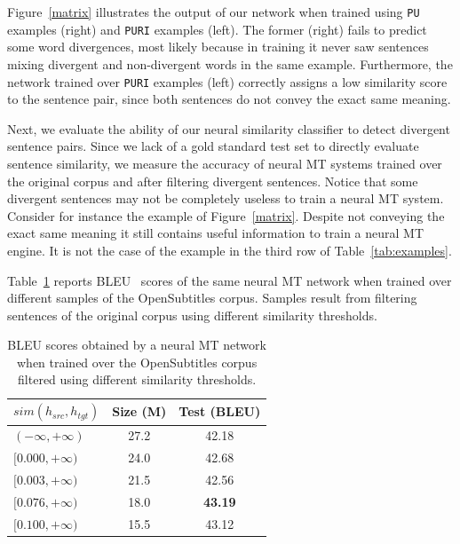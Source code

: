\documentclass[11pt,a4paper]{article}
\begin{document}
Figure~\ref{matrix} illustrates the output of our network when trained using \texttt{PU} examples (right) and \texttt{PURI} examples (left).  
The former (right) fails to predict some word divergences, most likely because in training it never saw sentences mixing divergent and non-divergent words in the same example. 
Furthermore, the network trained over \texttt{PURI} examples (left) correctly assigns a low similarity score to the sentence pair, since both sentences do not convey the exact same meaning.

Next, we evaluate the ability of our neural similarity classifier to detect divergent sentence pairs. 
Since we lack of a gold standard test set to directly evaluate sentence similarity, 
we measure the accuracy of neural MT systems trained over the original corpus and after filtering divergent sentences. 
Notice that some divergent sentences may not be completely useless to train a neural MT system. 
Consider for instance the example of Figure~\ref{matrix}. 
Despite not conveying the exact same meaning it still contains useful information to train a neural MT engine. 
It is not the case of the example in the third row of Table~\ref{tab:examples}.

Table~\ref{results_wemb} reports BLEU~\cite{P02-1040} scores of the same neural MT network when trained over different samples of the OpenSubtitles corpus.
Samples result from filtering sentences of the original corpus using different similarity thresholds.

\begin{table}[h]
\small
\center
\begin{tabular}{lcc}
\hline
\bf $sim(h_{src},h_{tgt})$ & \bf Size (M) & \bf Test (BLEU)\\%
\hline
$(-\infty,+\infty)$   & 27.2 & 42.18 \\ %
$[0.000,+\infty)$   & 24.0 & 42.68 \\ %
$[0.003,+\infty)$   & 21.5 & 42.56 \\ %
$[0.076,+\infty)$   & 18.0 & \bf 43.19 \\ %
$[0.100,+\infty)$   & 15.5 & 43.12 \\
\hline
\end{tabular}
\caption{BLEU scores obtained by a neural MT network when trained over the OpenSubtitles corpus filtered using different similarity thresholds.}
\label{results_wemb}
\end{table}
\end{document}

